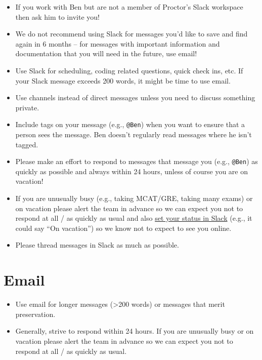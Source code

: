 \documentclass[
]{book}
\providecommand{\tightlist}{%
  \setlength{\itemsep}{0pt}\setlength{\parskip}{0pt}}
\begin{document}
\begin{itemize}
\item
  If you work with Ben but are not a member of Proctor's Slack workspace then ask him to invite you!
\item
  We do not recommend using Slack for messages you'd like to save and find again in 6 months -- for messages with important information and documentation that you will need in the future, use email!
\item
  Use Slack for scheduling, coding related questions, quick check ins, etc. If your Slack message exceeds 200 words, it might be time to use email.
\item
  Use channels instead of direct messages unless you need to discuss something private.
\item
  Include tags on your message (e.g., \texttt{@Ben}) when you want to ensure that a person sees the message. Ben doesn't regularly read messages where he isn't tagged.
\item
  Please make an effort to respond to messages that message you (e.g., \texttt{@Ben}) as quickly as possible and always within 24 hours, unless of course you are on vacation!
\item
  If you are unusually busy (e.g., taking MCAT/GRE, taking many exams) or on vacation please alert the team in advance so we can expect you not to respond at all / as quickly as usual and also \href{https://get.slack.help/hc/en-us/articles/201864558-Set-your-Slack-status-and-availability}{set your status in Slack} (e.g., it could say ``On vacation'') so we know not to expect to see you online.
\item
  Please thread messages in Slack as much as possible.
\end{itemize}

\section{Email}\label{email}

\begin{itemize}
\tightlist
\item
  Use email for longer messages (\textgreater200 words) or messages that merit preservation.
\item
  Generally, strive to respond within 24 hours. If you are unusually busy or on vacation please alert the team in advance so we can expect you not to respond at all / as quickly as usual.
\end{itemize}
\end{document}
